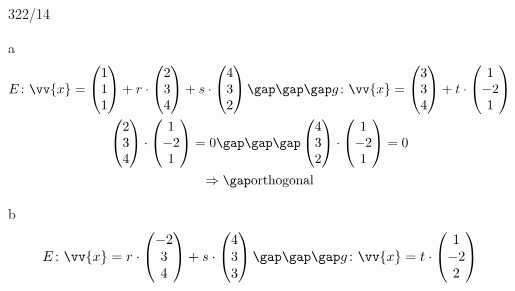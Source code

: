 \begin{exercise}{322/14}
  \item [a]
  \begin{gather*}
    E \colon \vv{x} = \begin{pmatrix}1 \\ 1 \\ 1\end{pmatrix} + r \cdot \begin{pmatrix}2 \\ 3 \\ 4\end{pmatrix} + s \cdot \begin{pmatrix}4 \\ 3 \\ 2\end{pmatrix} \gap\gap\gap g \colon \vv{x} = \begin{pmatrix}3 \\ 3 \\ 4\end{pmatrix} + t \cdot \begin{pmatrix}1 \\ -2 \\ 1\end{pmatrix} \\
    \begin{pmatrix}2 \\ 3 \\ 4\end{pmatrix} \cdot \begin{pmatrix}1 \\ -2 \\ 1\end{pmatrix} = 0 \gap\gap\gap \begin{pmatrix}4 \\ 3 \\ 2\end{pmatrix} \cdot \begin{pmatrix}1 \\ -2 \\ 1\end{pmatrix} = 0 \\
    \Rightarrow\gap \text{orthogonal}
  \end{gather*}
  \item [b]
  \begin{gather*}
    E \colon \vv{x} = r \cdot \begin{pmatrix}-2 \\ 3 \\ 4\end{pmatrix} + s \cdot \begin{pmatrix}4 \\ 3 \\ 3\end{pmatrix} \gap\gap\gap g \colon \vv{x} = t \cdot \begin{pmatrix}1 \\ -2 \\ 2\end{pmatrix} \\

\end{gather*}
\end{exercise}
